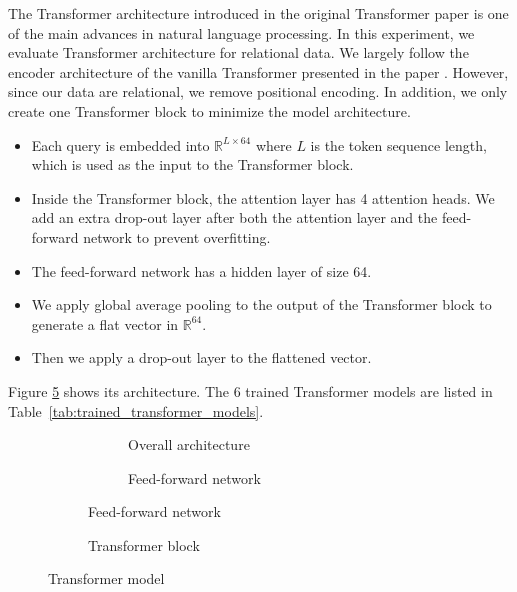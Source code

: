 
The Transformer architecture introduced in the original Transformer paper \cite{DBLP:journals/corr/VaswaniSPUJGKP17} is one of the main advances in natural language processing. In this experiment, we evaluate Transformer architecture for relational data. We largely follow the encoder architecture of the vanilla Transformer presented in the paper \cite{DBLP:journals/corr/VaswaniSPUJGKP17}. However, since our data are relational, we remove positional encoding. In addition, we only create one Transformer block to minimize the model architecture.


\begin{itemize}
	\item Each query is embedded into $\mathbb{R}^{L\times 64}$ where $L$ is the token sequence length, which is used as the input to the Transformer block.
	\item Inside the Transformer block, the attention layer has 4 attention heads. We add an extra drop-out layer after both the attention layer and the feed-forward network to prevent overfitting.
	\item The feed-forward network has a hidden layer of size 64.
	\item We apply global average pooling to the output of the Transformer block to generate a flat vector in $\mathbb{R}^{64}$.
        \item Then we apply a drop-out layer to the flattened vector.
\end{itemize}

Figure \ref{fig:transformer_model_all} shows its architecture. The 6 trained Transformer models are listed in Table~\ref{tab:trained_transformer_models}.
\begin{figure}[!th]
	\begin{subfigure}[]{0.4\textwidth}
		\begin{subfigure}[]{\textwidth}
			\centering
			
			\caption{Overall architecture}
			\label{fig:transformer_model}		
		\end{subfigure}
		\vfill
		\begin{subfigure}[]{\textwidth}
			\centering
			
			\caption{Feed-forward network}
			\label{fig:transformer_model_ffn}
		\end{subfigure}
	\end{subfigure}
	\hfill
	\centering
	\begin{subfigure}[]{0.5\textwidth}
		\centering
		
		\caption{Transformer block}
		\label{fig:transformer_model_block}
	\end{subfigure}
	\caption{Transformer model}
	\label{fig:transformer_model_all}
\end{figure}

